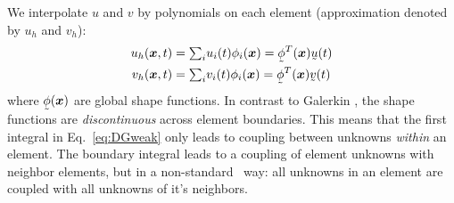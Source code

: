We interpolate $u$ and $v$ by
polynomials on each element (approximation denoted by $u_h$ and $v_h$):
\begin{align*}
    u_h(\vek x,t)&=\tsum_i u_i(t)\phi_i(\vek x)=\col\phi^T(\vek x)\col u(t)
\\
    v_h(\vek x,t)&=\tsum_i v_i(t)\phi_i(\vek x)=\col\phi^T(\vek x)\col v(t)
\end{align*}
where $\col\phi(\vek x)$ are global shape functions. In contrast to Galerkin
\fem, the shape functions are \emph{discontinuous} across element boundaries.
This means that the first integral in Eq.~\eqref{eq:DGweak} only leads to
coupling
between unknowns \emph{within} an element. The boundary integral leads to a
coupling of element unknowns with neighbor elements, but in a non-standard
\fem\ way: all unknowns in an element are coupled with all unknowns of it's
neighbors.
 
